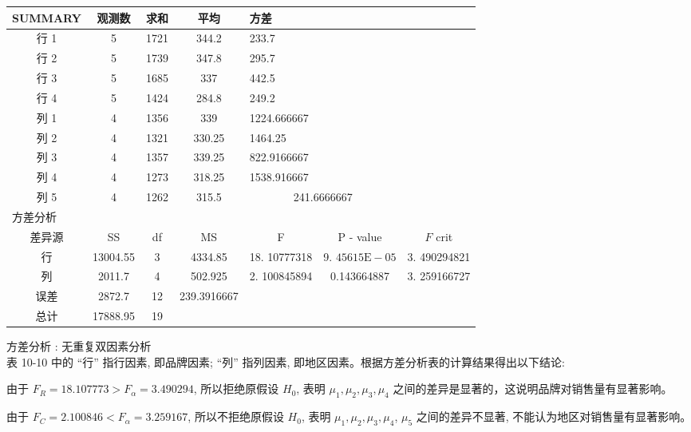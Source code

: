 \documentclass[10pt]{article}
\begin{document}
\begin{CJK*}{UTF8}{bsmi}
\begin{center}
\begin{tabular}{|c|c|c|c|c|c|c|}
\hline
SUMMARY & 观测数 & 求和 & 平均 & \multicolumn{2}{|l|}{方差} &  \\
\hline
行 1 & 5 & 1721 & 344.2 & \multicolumn{2}{|l|}{233.7} &  \\
\hline
行 2 & 5 & 1739 & 347.8 & \multicolumn{2}{|l|}{295.7} &  \\
\hline
行 3 & 5 & 1685 & 337 & \multicolumn{2}{|l|}{442.5} &  \\
\hline
行 4 & 5 & 1424 & 284.8 & \multicolumn{2}{|l|}{249.2} &  \\
\hline
列 1 & 4 & 1356 & 339 & \multicolumn{2}{|l|}{1224.666667} &  \\
\hline
列 2 & 4 & 1321 & 330.25 & \multicolumn{2}{|l|}{1464.25} &  \\
\hline
列 3 & 4 & 1357 & 339.25 & \multicolumn{2}{|l|}{822.9166667} &  \\
\hline
列 4 & 4 & 1273 & 318.25 & \multicolumn{2}{|l|}{1538.916667} &  \\
\hline
列 5 & 4 & 1262 & 315.5 & \multicolumn{2}{|c|}{241.6666667} &  \\
\hline
\multicolumn{7}{|l|}{方差分析} \\
\hline
差异源 & SS & df & MS & F & $\mathrm{P}$ - value & $F$ crit \\
\hline
行 & 13004.55 & 3 & 4334.85 & 18. 10777318 & 9. $45615 \mathrm{E}-05$ & 3. 490294821 \\
\hline
列 & 2011.7 & 4 & 502.925 & 2. 100845894 & 0.143664887 & 3. 259166727 \\
\hline
误差 & 2872.7 & 12 & 239.3916667 &  &  &  \\
\hline
总计 & 17888.95 & 19 &  &  &  &  \\
\hline
\end{tabular}
\end{center}

方差分析 : 无重复双因素分析\\
表 10-10 中的 “行” 指行因素, 即品牌因素; “列” 指列因素, 即地区因素。根据方差分析表的计算结果得出以下结论:

由于 $F_{R}=18.107773>F_{\alpha}=3.490294$, 所以拒绝原假设 $H_{0}$, 表明 $\mu_{1}, \mu_{2}, \mu_{3}, \mu_{4}$ 之间的差异是显著的，这说明品牌对销售量有显著影响。

由于 $F_{C}=2.100846<F_{\alpha}=3.259167$, 所以不拒绝原假设 $H_{0}$, 表明 $\mu_{1}, \mu_{2}, \mu_{3}, \mu_{4}$, $\mu_{5}$ 之间的差异不显著, 不能认为地区对销售量有显著影响。


\end{CJK*}
\end{document}
